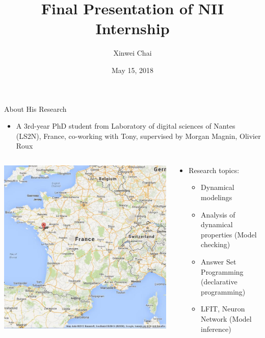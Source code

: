 \documentclass[8pt]{beamer}
\title{Final Presentation of NII Internship}%
\author{Xinwei Chai}
\date{May 15, 2018}
\begin{document}
\maketitle
\begin{frame}{About His Research}
\begin{itemize}
\item A 3rd-year PhD student from Laboratory of digital sciences of Nantes (LS2N), France, co-working with Tony, supervised by Morgan Magnin, Olivier Roux
\end{itemize}
\begin{columns}
\begin{column}{.5\textwidth}
\centering
\includegraphics[scale=0.27]{Nantes.jpg}
\end{column}
\begin{column}{.5\textwidth}
\begin{itemize}
\item Research topics:
\begin{itemize}
\item Dynamical modelings%
\item Analysis of dynamical properties (Model checking)
\item Answer Set Programming (declarative programming)
\item LFIT, Neuron Network (Model inference)
\end{itemize}
\end{itemize}

\end{column}
\end{columns}
\end{frame}
\end{document}
